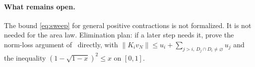 \documentclass{article}
\begin{document}
\paragraph{What remains open.}
The bound \eqref{eq:sweep} for general positive contractions is not
formalized. It is not needed for the area law. Elimination plan: if a later
step needs it, prove the norm-loss argument of~\cite{Anshu2016Simple} directly, with
$\|K_iv_N\|\le u_i+\sum_{j>i,\,D_j\cap D_i\ne\varnothing}u_j$ and the
inequality $(1-\sqrt{1-x})^2\le x$ on $[0,1]$.



\end{document}
